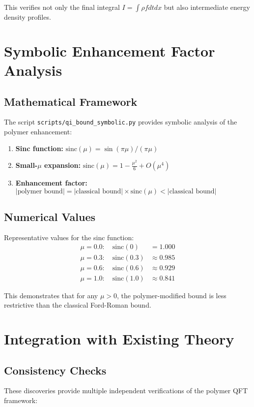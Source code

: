 \documentclass[11pt]{article}
\begin{document}
This verifies not only the final integral $I = \int\rho f dt dx$ but also intermediate energy density profiles.

\section{Symbolic Enhancement Factor Analysis}

\subsection{Mathematical Framework}
The script \texttt{scripts/qi\_bound\_symbolic.py} provides symbolic analysis of the polymer enhancement:

\begin{enumerate}
\item \textbf{Sinc function:} $\text{sinc}(\mu) = \sin(\pi\mu)/(\pi\mu)$
\item \textbf{Small-$\mu$ expansion:} $\text{sinc}(\mu) = 1 - \frac{\mu^2}{6} + O(\mu^4)$
\item \textbf{Enhancement factor:} $|\text{polymer bound}| = |\text{classical bound}| \times \text{sinc}(\mu) < |\text{classical bound}|$
\end{enumerate}

\subsection{Numerical Values}
Representative values for the sinc function:
\begin{align}
\mu = 0.0: \quad \text{sinc}(0) &= 1.000 \\
\mu = 0.3: \quad \text{sinc}(0.3) &\approx 0.985 \\
\mu = 0.6: \quad \text{sinc}(0.6) &\approx 0.929 \\
\mu = 1.0: \quad \text{sinc}(1.0) &\approx 0.841
\end{align}

This demonstrates that for any $\mu > 0$, the polymer-modified bound is less restrictive than the classical Ford-Roman bound.

\section{Integration with Existing Theory}

\subsection{Consistency Checks}
These discoveries provide multiple independent verifications of the polymer QFT framework:
\end{document}
